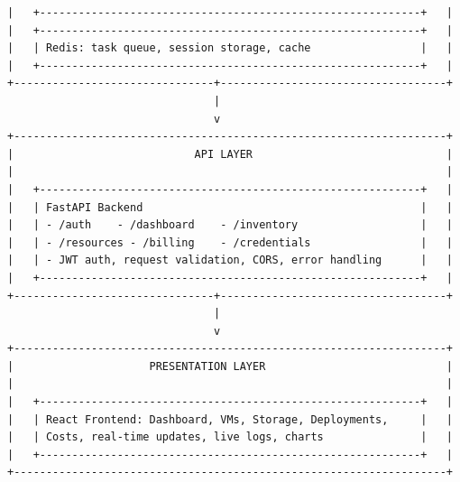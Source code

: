 \begin{lstlisting}[numbers=none,basicstyle=\ttfamily\tiny,caption={High-Level Architecture Adapted from docs/README.md}]
|   +-----------------------------------------------------------+   |
|   +-----------------------------------------------------------+   |
|   | Redis: task queue, session storage, cache                 |   |
|   +-----------------------------------------------------------+   |
+-------------------------------+-----------------------------------+
                                |
                                v
+-------------------------------------------------------------------+
|                            API LAYER                              |
|                                                                   |
|   +-----------------------------------------------------------+   |
|   | FastAPI Backend                                           |   |
|   | - /auth    - /dashboard    - /inventory                   |   |
|   | - /resources - /billing    - /credentials                 |   |
|   | - JWT auth, request validation, CORS, error handling      |   |
|   +-----------------------------------------------------------+   |
+-------------------------------+-----------------------------------+
                                |
                                v
+-------------------------------------------------------------------+
|                     PRESENTATION LAYER                            |
|                                                                   |
|   +-----------------------------------------------------------+   |
|   | React Frontend: Dashboard, VMs, Storage, Deployments,     |   |
|   | Costs, real-time updates, live logs, charts               |   |
|   +-----------------------------------------------------------+   |
+-------------------------------------------------------------------+
\end{lstlisting}

